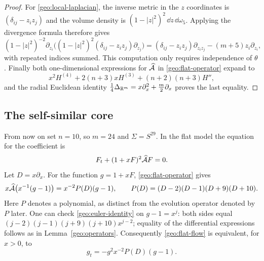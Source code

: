 \begin{proof}
For \eqref{geo:local-laplacian}, the inverse metric in the \(z\)
coordinates is \((\delta_{ij}-z_i z_j)\) and the volume density is
\((1-|z|^2)^2\,\dd z\,\dd\omega_5\).  Applying the divergence formula
therefore gives
\[
 (1-|z|^2)^{-2}\partial_{z_i}
 \big((1-|z|^2)^2(\delta_{ij}-z_i z_j)\partial_{z_j}\big)
 =(\delta_{ij}-z_i z_j)\partial_{z_i z_j}
   -(m+5)z_i\partial_{z_i},
\]
with repeated indices summed.  This computation only requires
independence of \(\theta\).  Finally both one-dimensional expressions
for \(\widehat{\mathcal A}\) in \eqref{geo:flat-operator} expand to
\[
 x^2H^{(4)}+2(n+3)xH^{(3)}+(n+2)(n+3)H'',
\]
and the radial Euclidean identity
\(\frac14\Delta_{\mathbb{R}^m}=x\partial_x^2+\frac m2\partial_x\)
proves the last equality.
\end{proof}

\subsection{The self-similar core}
\label{geo:core-section}

From now on set \(n=10\), so \(m=24\) and \(\Sigma=S^{29}\).  In the
flat model the equation for the coefficient is
\begin{equation}\label{geo:flat-flow}
 F_t+(1+xF)^2\widehat{\mathcal A} F=0.
\end{equation}
Let \(D=x\partial_x\).  For the function \(g=1+xF\),
\eqref{geo:flat-operator} gives
\begin{equation}\label{geo:euler-identity}
 x\widehat{\mathcal A}\big(x^{-1}(g-1)\big)
 =x^{-2}P(D)(g-1),\qquad
 P(D)=(D-2)(D-1)(D+9)(D+10).
\end{equation}
Here \(P\) denotes a polynomial, as distinct from the evolution
operator denoted by \(P\) later.  One can check
\eqref{geo:euler-identity} on \(g-1=x^j\): both sides equal
\((j-2)(j-1)(j+9)(j+10)x^{j-2}\); equality of the differential
expressions follows as in Lemma~\ref{geo:operators}.
Consequently \eqref{geo:flat-flow} is equivalent, for \(x>0\), to
\begin{equation}\label{geo:g-flow}
 g_t=-g^2x^{-2}P(D)(g-1).
\end{equation}

